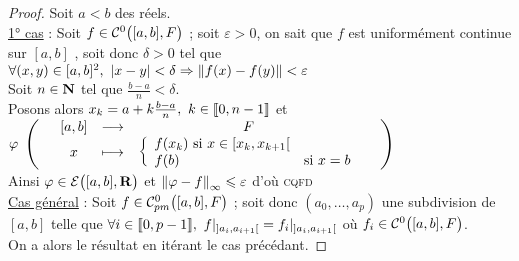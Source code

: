 
    \begin{proof}
    Soit $a<b$ des réels. \\ \underline{1° cas} : Soit $f\in{\mathcal{C}}^0\big([a,b],F\big)$ ; soit $\varepsilon>0$, on sait que $f$ est uniformément 
    continue sur $[a,b]$ %
    , soit donc $\delta>0$ tel que $\forall (x,y)\in[a,b]^2 ,~\left\vert x-y \right\vert<\delta \Rightarrow 
    \left\Vert f(x)-f(y) \right\Vert<\varepsilon$ \\ Soit $n\in{\mathbf{N}}$ tel que $\frac{b-a}{n}<\delta$. \\ Posons alors $x_k=a+k\frac{b-a}{n} , ~k\in{\llbracket 0,n-1 \rrbracket}$ et 
    $\varphi ~\appli{[a,b]}{x}{F}{\left\{ \begin{array}{ll} f(x_k)$ si $x\in[x_k,x_{k+1}[ \\ f(b) &$si $x=b \end{array}\right.}$ \\
    Ainsi $\varphi\in{\mathcal{E}\big([a,b],{\mathbf{R}}\big)}$ et $\left\Vert \varphi - f \right\Vert_{\infty} \leqslant \varepsilon$ d'où \textsc{cqfd} \vspace*{0.2cm} \\ 
    \underline{Cas général} : Soit $f\in{\mathcal{C}_{pm}^0}\big([a,b],F\big)$ ; soit donc $(a_0,\dots ,a_p)$ une subdivision de $[a,b]$ telle que $\forall 
    i\in{\llbracket 0,p-1 \rrbracket} , ~ f|_{]a_i,a_{i+1}[} = f_i|_{]a_i,a_{i+1}[}$ où $f_i\in{\mathcal{C}}^0\big([a,b],F\big)$. \\
    On a alors le résultat en itérant le cas précédant.
    \end{proof} \medskip

    \hfill {} \hfill ${}$
    \vspace*{0.5cm} \\
    
    \fin